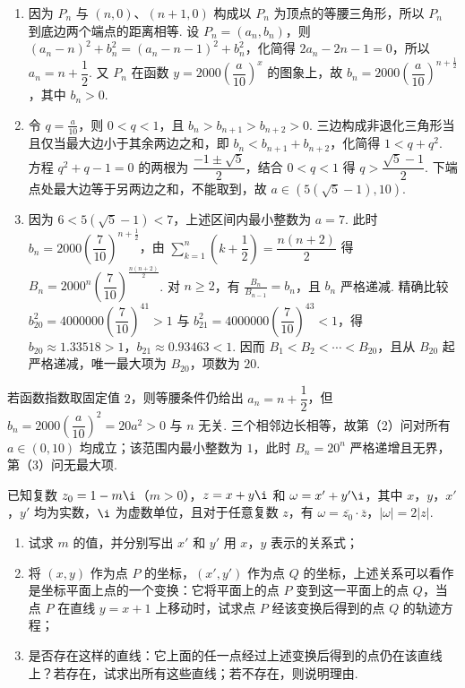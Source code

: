 \begin{solution}
\begin{enumerate}
\item 因为 \(P_n\) 与 \((n,0)\)、\((n+1,0)\) 构成以 \(P_n\) 为顶点的等腰三角形，所以 \(P_n\) 到底边两个端点的距离相等. 设 \(P_n=(a_n,b_n)\)，则
\((a_n-n)^2+b_n^2=(a_n-n-1)^2+b_n^2\)，化简得 \(2a_n-2n-1=0\)，所以 \(a_n=n+\dfrac{1}{2}\). 又 \(P_n\) 在函数 \(y=2000\left(\dfrac{a}{10}\right)^x\) 的图象上，故
\(b_n=2000\left(\dfrac{a}{10}\right)^{n+\frac12}\)，其中 \(b_n>0\).
\item 令 \(q=\frac{a}{10}\)，则 \(0<q<1\)，且 \(b_n>b_{n+1}>b_{n+2}>0\). 三边构成非退化三角形当且仅当最大边小于其余两边之和，即 \(b_n<b_{n+1}+b_{n+2}\)，化简得 \(1<q+q^2\). 方程 \(q^2+q-1=0\) 的两根为 \(\dfrac{-1\pm\sqrt5}{2}\)，结合 \(0<q<1\) 得 \(q>\dfrac{\sqrt5-1}{2}\). 下端点处最大边等于另两边之和，不能取到，故 \(a\in\left(5\left(\sqrt5-1\right),10\right)\).
\item 因为 \(6<5\left(\sqrt5-1\right)<7\)，上述区间内最小整数为 \(a=7\). 此时 \(b_n=2000\left(\dfrac{7}{10}\right)^{n+\frac12}\)，由 \(\displaystyle\sum_{k=1}^n\left(k+\dfrac12\right)=\dfrac{n(n+2)}2\) 得 \(B_n=2000^n\left(\dfrac{7}{10}\right)^{\frac{n(n+2)}2}\). 对 \(n\geqslant2\)，有 \(\frac{B_n}{B_{n-1}}=b_n\)，且 \(b_n\) 严格递减. 精确比较 \(b_{20}^2=4000000\left(\dfrac{7}{10}\right)^{41}>1\) 与 \(b_{21}^2=4000000\left(\dfrac{7}{10}\right)^{43}<1\)，得 \(b_{20}\approx1.33518>1\)，\(b_{21}\approx0.93463<1\). 因而 \(B_1<B_2<\cdots<B_{20}\)，且从 \(B_{20}\) 起严格递减，唯一最大项为 \(B_{20}\)，项数为 \(20\).
\end{enumerate}

若函数指数取固定值 \(2\)，则等腰条件仍给出 \(a_n=n+\dfrac12\)，但 \(b_n=2000\left(\dfrac a{10}\right)^2=20a^2>0\) 与 \(n\) 无关. 三个相邻边长相等，故第（2）问对所有 \(a\in(0,10)\) 均成立；该范围内最小整数为 \(1\)，此时 \(B_n=20^n\) 严格递增且无界，第（3）问无最大项.
\end{solution}

\begin{problem}
已知复数 \( z_0 = 1 - m\i \)（\( m > 0\)），\( z = x + y\i \) 和 \( \omega = x' + y'\i \)，其中 \(x\)，\(y\)，\(x'\)，\(y'\) 均为实数，\(\i\) 为虚数单位，且对于任意复数 \( z \)，有 \(\omega = \overline{z_0}\cdot\overline{z}\)，\(|\omega| = 2|z|\).
\begin{enumerate}
\item 试求 \(m\) 的值，并分别写出 \(x'\) 和 \(y'\) 用 \(x\)，\(y\) 表示的关系式；
\item 将 \((x, y)\) 作为点 \(P\) 的坐标，\((x', y')\) 作为点 \(Q\) 的坐标，上述关系可以看作是坐标平面上点的一个变换：它将平面上的点 \(P\) 变到这一平面上的点 \(Q\)，当点 \(P\) 在直线 \(y = x + 1\) 上移动时，试求点 \(P\) 经该变换后得到的点 \(Q\) 的轨迹方程；
\item 是否存在这样的直线：它上面的任一点经过上述变换后得到的点仍在该直线上？若存在，试求出所有这些直线；若不存在，则说明理由.
\end{enumerate}
\end{problem}

